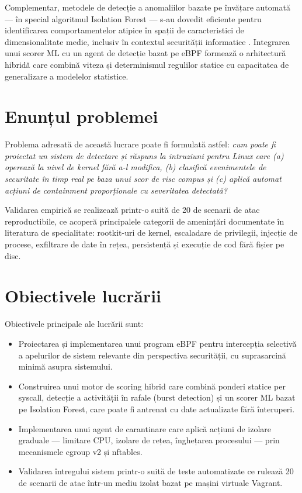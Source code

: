 \par Complementar, metodele de detecție a anomaliilor bazate pe învățare automată — în special algoritmul Isolation Forest \cite{Liu2008IF} — s-au dovedit eficiente pentru identificarea comportamentelor atipice în spații de caracteristici de dimensionalitate medie, inclusiv în contextul securității informatice \cite{Buczak2016}. Integrarea unui scorer ML cu un agent de detecție bazat pe eBPF formează o arhitectură hibridă care combină viteza și determinismul regulilor statice cu capacitatea de generalizare a modelelor statistice.


\section{Enunțul problemei}

\par Problema adresată de această lucrare poate fi formulată astfel: \textit{cum poate fi proiectat un sistem de detectare și răspuns la intruziuni pentru Linux care (a) operează la nivel de kernel fără a-l modifica, (b) clasifică evenimentele de securitate în timp real pe baza unui scor de risc compus și (c) aplică automat acțiuni de containment proporționale cu severitatea detectată?}

\par Validarea empirică se realizează printr-o suită de 20 de scenarii de atac reproductibile, ce acoperă principalele categorii de amenințări documentate în literatura de specialitate: rootkit-uri de kernel, escaladare de privilegii, injecție de procese, exfiltrare de date în rețea, persistență și execuție de cod fără fișier pe disc.


\section{Obiectivele lucrării}

\par Obiectivele principale ale lucrării sunt:

\begin{itemize}
    \item Proiectarea și implementarea unui program eBPF pentru intercepția selectivă a apelurilor de sistem relevante din perspectiva securității, cu suprasarcină minimă asupra sistemului.
    \item Construirea unui motor de scoring hibrid care combină ponderi statice per syscall, detecție a activității în rafale (burst detection) și un scorer ML bazat pe Isolation Forest, care poate fi antrenat cu date actualizate fără înteruperi.
    \item Implementarea unui agent de carantinare care aplică acțiuni de izolare graduale — limitare CPU, izolare de rețea, înghețarea procesului — prin mecanismele cgroup v2 și nftables.
    \item Validarea întregului sistem printr-o suită de teste automatizate ce rulează 20 de scenarii de atac într-un mediu izolat bazat pe mașini virtuale Vagrant.
\end{itemize}


